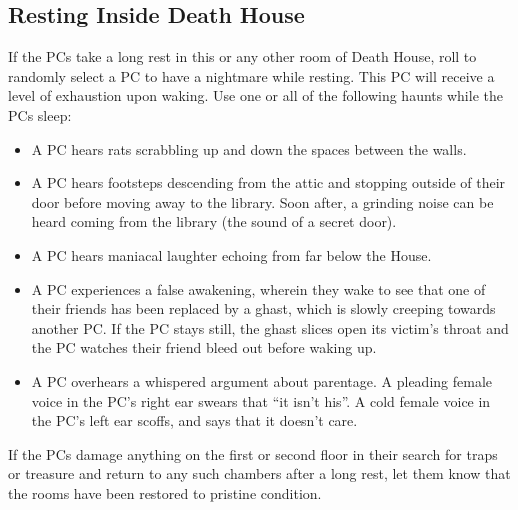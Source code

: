 \documentclass[a4paper,11pt]{article}
\begin{document}
\subsection*{Resting Inside Death House}
\label{sec:RestingInsideDeathHouse}
If the PCs take a long rest in this or any other room of Death House, roll to randomly select a PC to have
a nightmare while resting. This PC will receive a level of exhaustion upon waking. Use one or all of the
following haunts while the PCs sleep:
\begin{itemize}
  \item A PC hears rats scrabbling up and down the spaces between the walls.
  \item A PC hears footsteps descending from the attic and stopping outside of their door before moving away
  to the library. Soon after, a grinding noise can be heard coming from the library (the sound of a secret door).
  \item A PC hears maniacal laughter echoing from far below the House.
  \item A PC experiences a false awakening, wherein they wake to see that one of their friends has been replaced
  by a ghast, which is slowly creeping towards another PC. If the PC stays still, the ghast slices open its
  victim's throat and the PC watches their friend bleed out before waking up.
  \item A PC overhears a whispered argument about parentage. A pleading female voice in the PC's right ear
  swears that ``it isn't his''. A cold female voice in the PC's left ear scoffs, and says that it doesn't care.
\end{itemize}
If the PCs damage anything on the first or second floor in their search for traps or treasure and return to
any such chambers after a long rest, let them know that the rooms have been restored to pristine condition.
\end{document}

